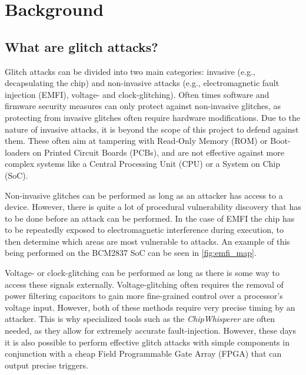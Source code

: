 

\chapter{Background}
\label{chap3}

\section{What are glitch attacks?}

Glitch attacks can be divided into two main categories: invasive (e.g., decapsulating the chip\cite{intro_to_hw_hacking}) and non-invasive attacks (e.g., electromagnetic fault injection (EMFI), voltage- and clock-glitching). Often times software and firmware security measures can only protect against non-invasive glitches, as protecting from invasive glitches often require hardware modifications\cite{glitchresistor}. Due to the nature of invasive attacks, it is beyond the scope of this project to defend against them. These often aim at tampering with Read-Only Memory (ROM) or Boot-loaders on Printed Circuit Boards (PCBs), and are not effective against more complex systems like a Central Processing Unit (CPU) or a System on Chip (SoC). 

Non-invasive glitches can be performed as long as an attacker has access to a device. However, there is quite a lot of procedural vulnerability discovery that has to be done before an attack can be performed. In the case of EMFI the chip has to be repeatedly exposed to electromagnetic interference during execution, to then determine which areas are most vulnerable to attacks\cite{emfi_injection}. An example of this being performed on the BCM2837 SoC can be seen in \autoref{fig:emfi_map}\cite{emfi_injection}. 

Voltage- or clock-glitching can be performed as long as there is some way to access these signals externally. Voltage-glitching often requires the removal of power filtering capacitors to gain more fine-grained control over a processor's voltage input. However, both of these methods require very precise timing by an attacker. This is why specialized tools such as the \textit{ChipWhisperer}\cite{chipWhisperer} are often needed, as they allow for extremely accurate fault-injection. However, these days it is also possible to perform effective glitch attacks with simple components in conjunction with a cheap Field Programmable Gate Array (FPGA) that can output precise triggers\cite{hole_in_soc}. 

